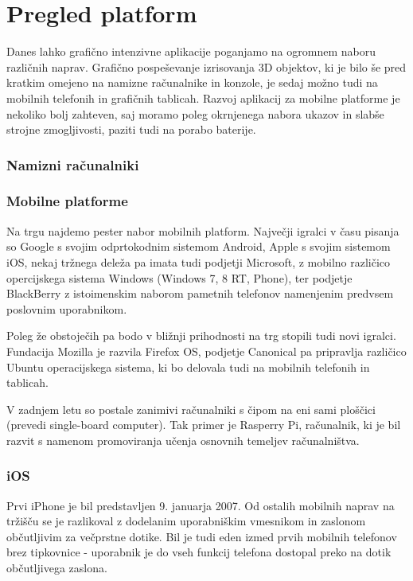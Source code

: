 \chapter{Pregled platform}

Danes lahko grafično intenzivne aplikacije poganjamo na ogromnem naboru različnih naprav. Grafično pospeševanje izrisovanja 3D objektov, ki je bilo še pred kratkim omejeno na namizne računalnike in konzole, je sedaj možno tudi na mobilnih telefonih in grafičnih tablicah. Razvoj aplikacij za mobilne platforme je nekoliko bolj zahteven, saj moramo poleg okrnjenega nabora ukazov in slabše strojne zmogljivosti, paziti tudi na porabo baterije.

\subsection{Namizni računalniki}

\subsection{Mobilne platforme} 

Na trgu najdemo pester nabor mobilnih platform. Največji igralci v času pisanja so Google s svojim odprtokodnim sistemom Android, Apple s svojim sistemom iOS, nekaj tržnega deleža pa imata tudi podjetji Microsoft, z mobilno različico opercijskega sistema Windows (Windows 7, 8 RT, Phone), ter podjetje BlackBerry z istoimenskim naborom pametnih telefonov namenjenim predvsem poslovnim uporabnikom.

Poleg že obstoječih pa bodo v bližnji prihodnosti na trg stopili tudi novi igralci. Fundacija Mozilla je razvila Firefox OS, podjetje Canonical pa pripravlja različico Ubuntu operacijskega sistema, ki bo delovala tudi na mobilnih telefonih in tablicah.

V zadnjem letu so postale zanimivi računalniki s čipom na eni sami ploščici (prevedi single-board computer). Tak primer je Rasperry Pi, računalnik, ki je bil razvit s namenom promoviranja učenja osnovnih temeljev računalništva.

\subsection{iOS}

Prvi iPhone je bil predstavljen 9. januarja 2007. Od ostalih mobilnih naprav na tržišču se je razlikoval z dodelanim uporabniškim vmesnikom in zaslonom občutljivim za večprstne dotike. Bil je tudi eden izmed prvih mobilnih telefonov brez tipkovnice - uporabnik je do vseh funkcij telefona dostopal preko na dotik občutljivega zaslona.


